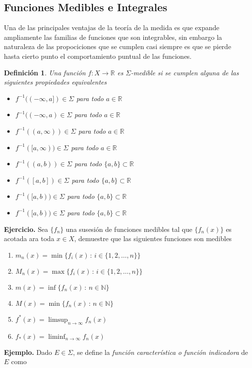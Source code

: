 \documentclass[letterpaper]{book}
\newtheorem{def.}{Definici\'on}[section]
\newcommand{\nat}{\ensuremath{ \mathbb N }}
\newcommand{\exe}{{\noindent \sc \textbf{Ejercicio. }}}
\newcommand{\eje}{{\noindent \sc \textbf{Ejemplo. }}}
\newcommand{\sig}{\ensuremath{\Sigma}}
\begin{document}
\subsection{Funciones Medibles e Integrales}
\noindent Una de las principales ventajas de la teoría de la medida es que expande ampliamente las familias de funciones que son integrables, sin embargo la naturaleza de las propociciones que se cumplen casi siempre es que se pierde hasta cierto punto el comportamiento puntual de las funciones.
\begin{def.}
Una función $f: X \to \mathbb{R}$ es $\sig$-medible si se cumplen alguna de las siguientes propiedades equivalentes
\begin{itemize}
  \item $f^{-1}((-\infty, a]) \in \sig$ para todo $a \in \mathbb{R}$
  \item $f^{-1}((-\infty, a) \in \sig$ para todo $a \in \mathbb{R}$
  \item $f^{-1}((a, \infty)) \in \sig$ para todo $a \in \mathbb{R}$
  \item $f^{-1}([a, \infty)) \in \sig$ para todo $a \in \mathbb{R}$
  \item $f^{-1}((a, b)) \in \sig$ para todo $\{a,b\} \subset \mathbb{R}$
  \item $f^{-1}([a, b]) \in \sig$ para todo $\{a,b\} \subset \mathbb{R}$
  \item $f^{-1}([a, b)) \in \sig$ para todo $\{a,b\} \subset \mathbb{R}$
  \item $f^{-1}([a, b)) \in \sig$ para todo $\{a,b\} \subset \mathbb{R}$
\end{itemize}
\end{def.}
\exe Sea $\{f_n\}$ una susesión de funciones medibles tal que $\{f_n(x)\}$ es acotada ara toda $x\in X$, demuestre que las siguientes funciones son medibles
\begin{enumerate}
\item $m_n(x)=\min\{f_i(x)\,:\,i\in\{1,2,\dots,n\}\}$
\item $M_n(x)=\max\{f_i(x)\,:\,i\in\{1,2,\dots,n\}\}$
\item $m(x)=\inf\{f_n(x)\,:\,n\in\nat\}$
\item $M(x)=\min\{f_n(x)\,:\,n\in\nat\}$
\item $f^{*}(x)=\limsup_{n\to\infty}f_n(x)$
\item $f_*(x)=\liminf_{n\to\infty}f_n(x)$
\end{enumerate}
\eje Dado $E\in\sig$, se define la \emph{función característica o función indicadora} de $E$ como
\end{document}
